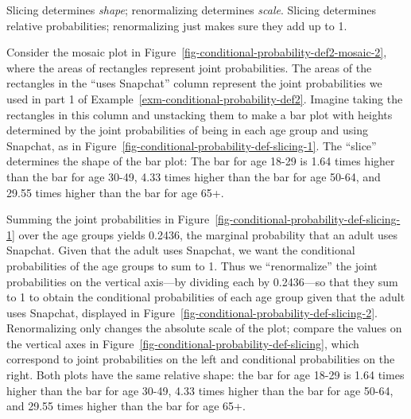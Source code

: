 \documentclass[
  letterpaper,
  DIV=11,
  numbers=noendperiod]{scrreprt}
\theoremstyle{plain}
\theoremstyle{definition}
\theoremstyle{definition}
\theoremstyle{definition}
\theoremstyle{remark}
\begin{document}
Slicing determines \emph{shape}; renormalizing determines \emph{scale}.
Slicing determines relative probabilities; renormalizing just makes sure
they add up to 1.

Consider the mosaic plot in
Figure~\ref{fig-conditional-probability-def2-mosaic-2}, where the areas
of rectangles represent joint probabilities. The areas of the rectangles
in the ``uses Snapchat'' column represent the joint probabilities we
used in part 1 of Example~\ref{exm-conditional-probability-def2}.
Imagine taking the rectangles in this column and unstacking them to make
a bar plot with heights determined by the joint probabilities of being
in each age group and using Snapchat, as in
Figure~\ref{fig-conditional-probability-def-slicing-1}. The ``slice''
determines the shape of the bar plot: The bar for age 18-29 is 1.64
times higher than the bar for age 30-49, 4.33 times higher than the bar
for age 50-64, and 29.55 times higher than the bar for age 65+.

Summing the joint probabilities in
Figure~\ref{fig-conditional-probability-def-slicing-1} over the age
groups yields 0.2436, the marginal probability that an adult uses
Snapchat. Given that the adult uses Snapchat, we want the conditional
probabilities of the age groups to sum to 1. Thus we ``renormalize'' the
joint probabilities on the vertical axis---by dividing each by
0.2436---so that they sum to 1 to obtain the conditional probabilities
of each age group given that the adult uses Snapchat, displayed in
Figure~\ref{fig-conditional-probability-def-slicing-2}. Renormalizing
only changes the absolute scale of the plot; compare the values on the
vertical axes in Figure~\ref{fig-conditional-probability-def-slicing},
which correspond to joint probabilities on the left and conditional
probabilities on the right. Both plots have the same relative shape: the
bar for age 18-29 is 1.64 times higher than the bar for age 30-49, 4.33
times higher than the bar for age 50-64, and 29.55 times higher than the
bar for age 65+.
\end{document}
